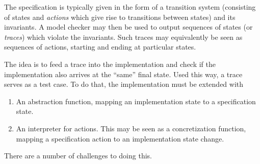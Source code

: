 \documentclass[a4paper]{article}
\begin{document}
The specification is typically given in the form of a transition system (consisting of states and \emph{actions} which give rise to transitions between states) and its invariants.
%
A model checker may then be used to output sequences of states (or \emph{traces}) which violate the invariants.
%
Such traces may equivalently be seen as sequences of actions, starting and ending at particular states.

The idea is to feed a trace into the implementation and check if the implementation also arrives at the ``same'' final state. Used this way, a trace serves as a test case.
%
To do that, the implementation must be extended with

\begin{enumerate}
    \item An abstraction function, mapping an implementation state to a specification state.

    \item An interpreter for actions. This may be seen as a concretization function, mapping a specification action to an implementation state change.
\end{enumerate}

There are a number of challenges to doing this.
\end{document}
